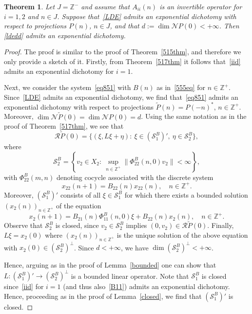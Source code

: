 \documentclass[11pt,reqno,a4paper]{amsart}
\theoremstyle{plain}
\numberwithin{equation}{section}
\newtheorem{theorem}{Theorem}
\theoremstyle{remark}
\def\Z{\mathbb{Z}}
\begin{document}
\begin{theorem}
Let $J=\mathbb Z^-$ and assume that $A_{ii}(n)$ is an invertible operator for $i=1, 2$ and $n\in J$. Suppose that~\eqref{LDE} admits an exponential dichotomy with respect to projections $P(n)$, $n\in J$, and that $d:=\dim \mathcal NP(0)<+\infty$. Then \eqref{ldedd} admits an exponential dichotomy.

\end{theorem}

\begin{proof}
The proof is similar to the proof of Theorem~\ref{515thm}, and therefore we only provide a sketch of it. 
Firstly, from Theorem~\ref{517thm} it follows that~\eqref{iid} admits an exponential dichotomy for $i=1$.

Next, we consider the system~\eqref{eq851} with $B(n)$ as in~\eqref{555eq} for $n\in \Z^+$. Since~\eqref{LDE} admits an exponential dichotomy, we find that~\eqref{eq851} admits an exponential dichotomy with respect to projections $\tilde P(n)=P(-n)^*$, $n\in \Z^+$. Moreover, $\dim \mathcal N\tilde P(0)=\dim \mathcal NP(0)=d$. Using the same notation as in the proof of Theorem~\ref{517thm},  we see that
\[
\mathcal R\tilde P(0)=\{(\xi, L\xi+\eta): \ \xi \in (\mathcal S_1^B)', \ \eta \in \mathcal S_2^B\},
\]
where
\[
\mathcal S_2^B=\left \{v_2\in X_2: \ \sup_{n\in \Z^+}\|\Phi_{22}^B(n, 0)v_2\|<\infty\right \},
\]
with $\Phi_{22}^B(m, n)$ denoting cocycle associated with the discrete system
\begin{equation}\label{654s}
x_{22}(n+1)=B_{22}(n)x_{22}(n), \quad n\in \Z^+.
\end{equation}
Moreover, $(\mathcal S_1^B)'$ consists of all $\xi\in \mathcal S_1^B$ for which there exists a bounded solution $(x_2(n))_{n\in \Z^+}$ of the equation
\[
x_2(n+1)=B_{21}(n)\Phi_{11}^B(n, 0)\xi+B_{22}(n)x_2(n), \quad n\in \Z^+.
\] Observe that $\mathcal S_2^B$ is closed, since $v_2\in \mathcal S_2^B$ implies $(0, v_2)\in \mathcal R\tilde P(0)$.
Finally, $L\xi=x_2(0)$ where $(x_2(n))_{n\in \Z^+}$ is the unique solution of the above equation with $x_2(0)\in (\mathcal S_2^B)^\perp$. Since $d<+\infty$, we have $\dim (\mathcal S_2^B)^\perp<+\infty$. 


Hence, arguing as in the proof of Lemma~\ref{bounded} one can show that $L\colon (\mathcal S_1^B)'\to (\mathcal S_2^B)^\perp$ is a bounded linear operator. Note that $\mathcal S_1^B$ is closed since~\eqref{iid}  for $i=1$ (and thus also~\eqref{B11}) admits an exponential dichotomy.
Hence, proceeding as in the proof of Lemma~\ref{closed}, we find that $(\mathcal S_1^B)'$ is closed.


\end{proof}
\end{document}
